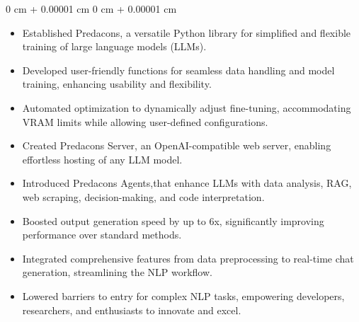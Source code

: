 \documentclass[10pt, letterpaper]{article}
\newenvironment{highlights}{
    \begin{itemize}[
        topsep=0.03 cm,
        parsep=0.02 cm,
        partopsep=0pt,
        itemsep=0pt,
        leftmargin=0 cm + 5pt
    ]
}{
    \end{itemize}
} %
\newenvironment{onecolentry}{
    \begin{adjustwidth}{
        0 cm + 0.00001 cm
    }{
        0 cm + 0.00001 cm
    }
}{
    \end{adjustwidth}
} %
\begin{document}
    \begin{onecolentry}
        \begin{adjustwidth}{0.4cm}{0cm}
            \begin{highlights}
                \item Established Predacons, a versatile Python library for simplified and flexible training of large language models (LLMs).
                \item Developed user-friendly functions for seamless data handling and model training, enhancing usability and flexibility.
                \item Automated optimization to dynamically adjust fine-tuning, accommodating VRAM limits while allowing user-defined configurations.
                \item Created Predacons Server, an OpenAI-compatible web server, enabling effortless hosting of any LLM model.
                \item Introduced Predacons Agents,that enhance LLMs with data analysis, RAG, web scraping, decision-making, and code interpretation.
                \item Boosted output generation speed by up to 6x, significantly improving performance over standard methods.
                \item Integrated comprehensive features from data preprocessing to real-time chat generation, streamlining the NLP workflow.
                \item Lowered barriers to entry for complex NLP tasks, empowering developers, researchers, and enthusiasts to innovate and excel.
            \end{highlights}
        \end{adjustwidth}
    \end{onecolentry}
    
    
\end{document}
